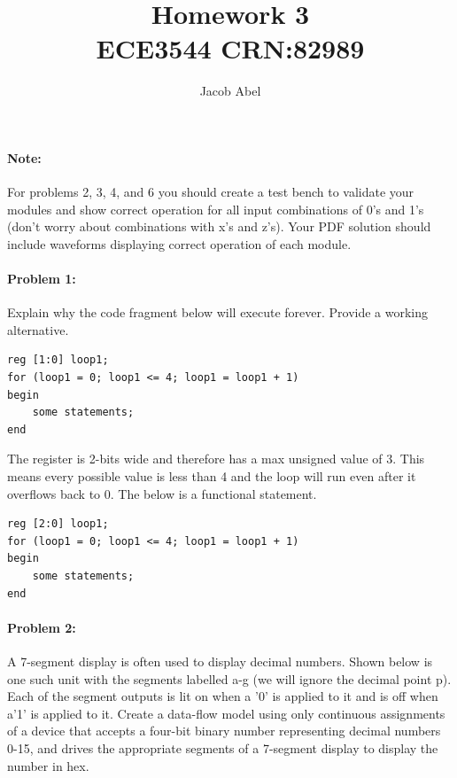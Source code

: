 \documentclass[12pt,letterpaper,titlepage]{article}
\author{Jacob Abel}
\title{	Homework 3
	\\\large ECE3544 CRN:82989
}
\begin{document}
\maketitle
\begin{raggedright}
\paragraph{Note: }

For problems 2, 3, 4, and 6 you should create a test bench to validate your modules and show correct operation for all input combinations of 0's and 1's (don't worry about combinations with x's and z's). Your PDF solution should include waveforms displaying correct operation of each module.

\paragraph{Problem 1: }
Explain why the code fragment below will execute forever. Provide a working alternative.

\begin{lstlisting}
reg [1:0] loop1;
for (loop1 = 0; loop1 <= 4; loop1 = loop1 + 1)
begin
    some statements;
end
\end{lstlisting}

The register is 2-bits wide and therefore has a max unsigned value of 3. This means every possible value is less than 4 and the loop will run even after it overflows back to 0. The below is a functional statement.

\begin{lstlisting}
reg [2:0] loop1;
for (loop1 = 0; loop1 <= 4; loop1 = loop1 + 1)
begin
    some statements;
end
\end{lstlisting}

\clearpage

\paragraph{Problem 2: }
A 7-segment display is often used to display decimal numbers. Shown below is one such unit with the segments labelled a-g (we will ignore the decimal point p). Each of the segment outputs is lit on when a '0' is applied to it and is off when a'1' is applied to it. Create a data-flow model using only continuous assignments of a device that accepts a four-bit binary number representing decimal numbers 0-15, and drives the appropriate segments of a 7-segment display to display the number in hex. 


\end{raggedright}
\end{document}
